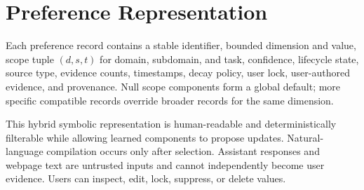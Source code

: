 \section{Preference Representation}
\label{sec:representation}

Each preference record contains a stable identifier, bounded dimension and value,
scope tuple $(d,s,t)$ for domain, subdomain, and task, confidence, lifecycle state,
source type, evidence counts, timestamps, decay policy, user lock, user-authored
evidence, and provenance. Null scope components form a global default; more
specific compatible records override broader records for the same dimension.

This hybrid symbolic representation is human-readable and deterministically
filterable while allowing learned components to propose updates. Natural-language
compilation occurs only after selection. Assistant responses and webpage text are
untrusted inputs and cannot independently become user evidence. Users can inspect,
edit, lock, suppress, or delete values.

